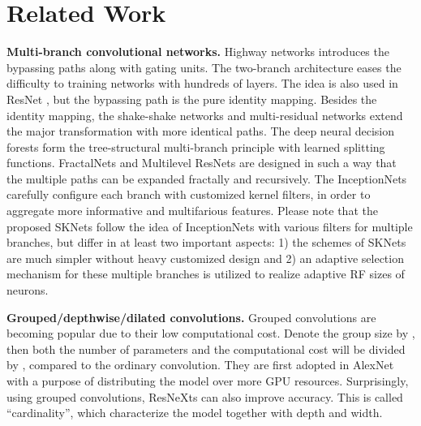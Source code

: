 \documentclass[10pt,twocolumn,letterpaper]{article}
\begin{document}
\section{Related Work}
	\noindent \textbf{Multi-branch convolutional networks.} Highway networks \cite{srivastava2015highway} introduces the bypassing paths along with gating units. The two-branch architecture eases the difficulty to training networks with hundreds of layers. The idea is also used in ResNet \cite{he2016deep,he2016identity}, but the bypassing path is the pure identity mapping. Besides the identity mapping, the shake-shake networks \cite{gastaldi2017shake} and multi-residual networks \cite{abdi2016multi} extend the major transformation with more identical paths. The deep neural decision forests \cite{kontschieder2015deep} form the tree-structural multi-branch principle with learned splitting functions. FractalNets \cite{larsson2016fractalnet} and Multilevel ResNets \cite{zhang2017residual} are designed in such a way that the multiple paths can be expanded fractally and recursively. The InceptionNets \cite{szegedy2015going,ioffe2015batch,szegedy2016rethinking,szegedy2017inception} carefully configure each branch with customized kernel filters, in order to aggregate more informative and multifarious features. Please note that the proposed SKNets follow the idea of InceptionNets with various filters for multiple branches, but differ in at least two important aspects: 1) the schemes of SKNets are much simpler without heavy customized design and 2) an adaptive selection mechanism for these multiple branches is utilized to realize adaptive RF sizes of neurons.
	
	
	\noindent \textbf{Grouped/depthwise/dilated convolutions.} Grouped convolutions are becoming popular due to their low computational cost. Denote the group size by , then both the number of parameters and the computational cost will be divided by , compared to the ordinary convolution. They are first adopted in AlexNet \cite{krizhevsky2012imagenet} with a purpose of distributing the model over more GPU resources. Surprisingly, using grouped convolutions, ResNeXts \cite{xie2017aggregated} can also improve accuracy. This  is called ``cardinality'', which characterize the model together with depth and width. 
\end{document}
